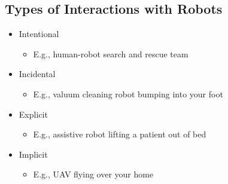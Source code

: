 \documentclass[10pt]{article}
\begin{document}
\subsection*{Types of Interactions with Robots}
\begin{itemize}
	\item Intentional
	\begin{itemize}
        \item E.g., human-robot search and rescue team
    \end{itemize}
	\item Incidental
	\begin{itemize}
        \item E.g., valuum cleaning robot bumping into your foot
    \end{itemize}
	\item Explicit
	\begin{itemize}
        \item E.g., assistive robot lifting a patient out of bed
    \end{itemize}
	\item Implicit
	\begin{itemize}
        \item E.g., UAV flying over your home
    \end{itemize}
\end{itemize}
\end{document}
